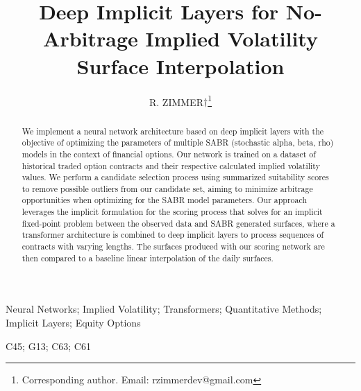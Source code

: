 
\title{Deep Implicit Layers for No-Arbitrage Implied Volatility Surface Interpolation}

\author{
    R. ZIMMER$\dag$\thanks{Corresponding author.
    Email: rzimmerdev@gmail.com}\\
}

\maketitle

\begin{abstract}
    We implement a neural network architecture based on deep implicit layers with the objective of optimizing the parameters of
    multiple SABR (stochastic alpha, beta, rho) models in the context of financial options.
    Our network is trained on a dataset of historical traded option contracts and their respective calculated implied volatility values.
    We perform a candidate selection process using summarized suitability scores to remove possible outliers from our candidate set,
    aiming to minimize arbitrage opportunities when optimizing for the SABR model parameters.
    Our approach leverages the implicit formulation for the scoring process that solves for an implicit fixed-point problem
    between the observed data and SABR generated surfaces,
    where a transformer architecture is combined to deep implicit layers to process sequences of contracts with varying lengths.
    The surfaces produced with our scoring network are then compared to a baseline linear interpolation of the daily surfaces.
\end{abstract}

\begin{keywords}
    Neural Networks; Implied Volatility; Transformers; Quantitative Methods; Implicit Layers; Equity Options
\end{keywords}

\begin{classcode}
    C45; G13; C63; C61
\end{classcode}